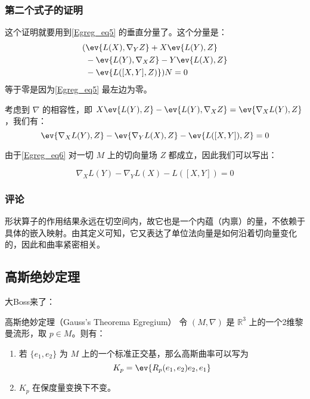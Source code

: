 \subsubsection{第二个式子的证明}

这个证明就要用到\autoref{Egreg_eq5} 的垂直分量了。这个分量是：
\begin{equation}
\begin{aligned}
(&\ev{L(X), \nabla_YZ}+X\ev{L(Y), Z}\\&-\ev{L(Y), \nabla_XZ}-Y\ev{L(X), Z}\\&-\ev{L([X, Y], Z)})N=0
\end{aligned}
\end{equation}
等于零是因为\autoref{Egreg_eq5} 最左边为零。

考虑到 $\nabla$ 的相容性，即 $X\ev{L(Y), Z}-\ev{L(Y), \nabla_XZ}=\ev{\nabla_XL(Y), Z}$，我们有：
\begin{equation}\label{Egreg_eq6}
\ev{\nabla_XL(Y), Z}-\ev{\nabla_YL(X), Z}-\ev{L([X, Y]), Z}=0
\end{equation}

由于\autoref{Egreg_eq6} 对一切 $M$ 上的切向量场 $Z$ 都成立，因此我们可以写出：

\begin{equation}
\nabla_XL(Y)-\nabla_YL(X)-L([X, Y])=0
\end{equation}

\subsubsection{评论}

形状算子的作用结果永远在切空间内，故它也是一个内蕴（内禀）的量，不依赖于具体的嵌入映射。由其定义可知，它又表达了单位法向量是如何沿着切向量变化的，因此和曲率紧密相关。





\subsection{高斯绝妙定理}

大Boss来了：

\begin{theorem}{高斯绝妙定理（Gauss's Theorema Egregium）}
令 $(M, \nabla)$ 是 $\mathbb{R}^3$ 上的一个2维黎曼流形，取 $p\in M$。则有：
\begin{enumerate}
\item 若 $\{e_1, e_2\}$ 为 $M$ 上的一个标准正交基，那么高斯曲率可以写为
\begin{equation}
K_p=\ev{R_p(e_1, e_2)e_2, e_1}
\end{equation}
\item $K_p$ 在保度量变换下不变。
\end{enumerate}

\end{theorem}

